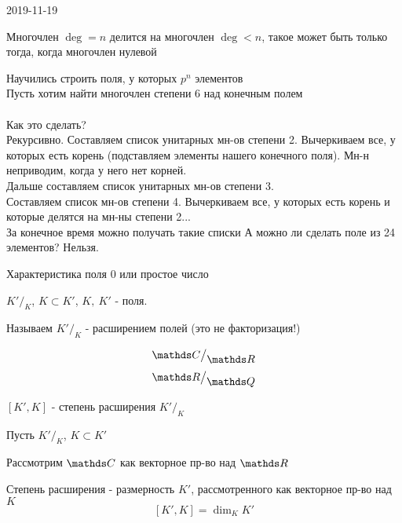 \documentclass[main.tex]{subfiles}
\begin{document}
\begin{lect}{2019-11-19}
\begin{Proof}
\begin{enumerate}
        Многочлен $\deg = n$ делится на многочлен $\deg < n$, такое может быть только тогда,
        когда многочлен нулевой
      \end{enumerate}
      Научились строить поля, у которых $p^n$ элементов\\
      Пусть хотим найти многочлен степени 6 над конечным полем\\ \ \\
      Как это сделать?\\
      Рекурсивно. Составляем список унитарных мн-ов степени 2. Вычеркиваем все, у которых есть корень (подставляем элементы нашего конечного поля). Мн-н неприводим, когда у него нет корней.\\
      Дальше составляем список унитарных мн-ов степени 3.\\
      Составляем список мн-ов степени 4. Вычеркиваем все,
      у которых есть корень и которые делятся на мн-ны степени 2...\\
      За конечное время можно получать такие списки
      А можно ли сделать поле из 24 элементов? Нельзя.

      \begin{reminder}
          Характеристика поля 0 или простое число
      \end{reminder}

      \begin{definition}
          $K'\big/_{\displaystyle K}$, $K \subset K'$, $K,\ K'$ - поля.

          Называем $K'\big/_{\displaystyle K}$ - расширением полей (это не факторизация!)
      \end{definition}

      \begin{Example}
          \[\CC\big/_{\displaystyle \R}\]
          \[\R\big/_{\displaystyle \Q}\]
      \end{Example}

      \begin{definition}
          $[K', K]$ - степень расширения $K'\big/_{\displaystyle K}$
      \end{definition}

      Пусть $K'\big/_{\displaystyle K}$, $K \subset K'$

      Рассмотрим $\CC$ как векторное пр-во над $\R$

      \begin{remark}
          Степень расширения - размерность $K'$, рассмотренного как векторное пр-во над $K$
          \[[K',K] = \dim_K K'\]
      \end{remark}


\end{Proof}
\end{lect}
\end{document}
